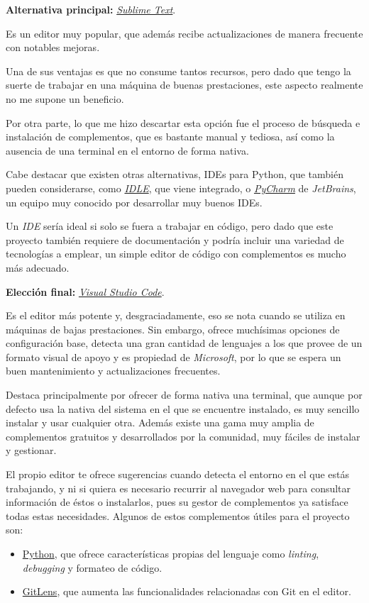 \textbf{Alternativa principal:} \href{https://www.sublimetext.com/}{\textit{Sublime Text}}.

Es un editor muy popular, que además recibe actualizaciones de manera frecuente con notables mejoras.

Una de sus ventajas es que no consume tantos recursos, pero dado que tengo la suerte de trabajar en una máquina de buenas prestaciones, este aspecto realmente no me supone un beneficio.

Por otra parte, lo que me hizo descartar esta opción fue el proceso de búsqueda e instalación de complementos, que es bastante manual y tediosa, así como la ausencia de una terminal en el entorno de forma nativa.

Cabe destacar que existen otras alternativas, IDEs para Python, que también pueden considerarse, como \href{https://docs.python.org/3/library/idle.html}{\textit{IDLE}}, que viene integrado, o \href{https://www.jetbrains.com/es-es/pycharm/}{\textit{PyCharm}} de \textit{JetBrains}, un equipo muy conocido por desarrollar muy buenos IDEs.

Un \textit{IDE} sería ideal si solo se fuera a trabajar en código, pero dado que este proyecto también requiere de documentación y podría incluir una variedad de tecnologías a emplear, un simple editor de código con complementos es mucho más adecuado.

\textbf{Elección final:} \href{https://code.visualstudio.com/}{\textit{Visual Studio Code}}.

Es el editor más potente y, desgraciadamente, eso se nota cuando se utiliza en máquinas de bajas prestaciones. Sin embargo, ofrece muchísimas opciones de configuración base, detecta una gran cantidad de lenguajes a los que provee de un formato visual de apoyo y es propiedad de \textit{Microsoft}, por lo que se espera un buen mantenimiento y actualizaciones frecuentes.

Destaca principalmente por ofrecer de forma nativa una terminal, que aunque por defecto usa la nativa del sistema en el que se encuentre instalado, es muy sencillo instalar y usar cualquier otra. Además existe una gama muy amplia de complementos gratuitos y desarrollados por la comunidad, muy fáciles de instalar y gestionar. 

El propio editor te ofrece sugerencias cuando detecta el entorno en el que estás trabajando, y ni si quiera es necesario recurrir al navegador web para consultar información de éstos o instalarlos, pues su gestor de complementos ya satisface todas estas necesidades. Algunos de estos complementos útiles para el proyecto son:
\begin{itemize}
    \item \href{https://marketplace.visualstudio.com/items?itemName=ms-python.python}{Python}, que ofrece características propias del lenguaje como \textit{linting}, \textit{debugging} y formateo de código.
    \item \href{https://marketplace.visualstudio.com/items?itemName=eamodio.gitlens}{GitLens}, que aumenta las funcionalidades relacionadas con Git en el editor.
\end{itemize}

